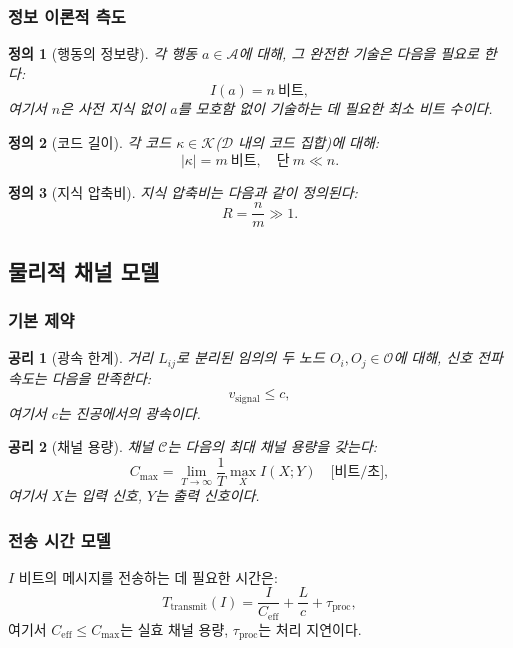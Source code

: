 \documentclass[12pt,a4paper]{article}
\newtheorem{definition}{정의}
\newtheorem{axiom}{공리}
\begin{document}
	\subsubsection{정보 이론적 측도}
	
	\begin{definition}[행동의 정보량]
		각 행동 $a \in \mathcal{A}$에 대해, 그 완전한 기술은 다음을 필요로 한다:
		\[
		I(a) = n \ \text{비트},
		\]
		여기서 $n$은 사전 지식 없이 $a$를 모호함 없이 기술하는 데 필요한 최소 비트 수이다.
	\end{definition}
	
	\begin{definition}[코드 길이]
		각 코드 $\kappa \in \mathcal{K}$($\mathcal{D}$ 내의 코드 집합)에 대해:
		\[
		|\kappa| = m \ \text{비트}, \quad \text{단} \ m \ll n.
		\]
	\end{definition}
	
	\begin{definition}[지식 압축비]
		지식 압축비는 다음과 같이 정의된다:
		\[
		R = \frac{n}{m} \gg 1.
		\]
	\end{definition}
	
	\subsection{물리적 채널 모델}
	\label{app:channel-model}
	
	\subsubsection{기본 제약}
	
	\begin{axiom}[광속 한계]
		거리 $L_{ij}$로 분리된 임의의 두 노드 $O_i, O_j \in \mathcal{O}$에 대해, 신호 전파 속도는 다음을 만족한다:
		\[
		v_{\text{signal}} \leq c,
		\]
		여기서 $c$는 진공에서의 광속이다.
	\end{axiom}
	
	\begin{axiom}[채널 용량]
		채널 $\mathcal{C}$는 다음의 최대 채널 용량을 갖는다:
		\[
		C_{\text{max}} = \lim_{T \to \infty} \frac{1}{T} \max_{X} I(X; Y) \quad \text{[비트/초]},
		\]
		여기서 $X$는 입력 신호, $Y$는 출력 신호이다.
	\end{axiom}
	
	\subsubsection{전송 시간 모델}
	
	$I$ 비트의 메시지를 전송하는 데 필요한 시간은:
	\[
	T_{\text{transmit}}(I) = \frac{I}{C_{\text{eff}}} + \frac{L}{c} + \tau_{\text{proc}},
	\]
	여기서 $C_{\text{eff}} \leq C_{\text{max}}$는 실효 채널 용량, $\tau_{\text{proc}}$는 처리 지연이다.
	
\end{document}
